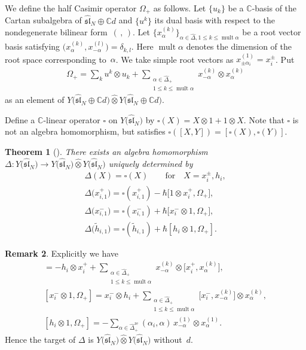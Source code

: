 \documentclass[10pt,a4paper]{amsart}
\newtheorem{thm}{Theorem}[section]
\theoremstyle{definition}
\newtheorem{rem}[thm]{Remark}
\numberwithin{equation}{section}
\DeclareMathOperator{\mult}{mult}
\newcommand{\bbC}{\mathbb{C}}
\newcommand{\affY}{Y\big(\affsl\big)}
\newcommand{\affsl}{\hat{\mathfrak{sl}}_N}
\begin{document}
We define the half Casimir operator $\Omega_+$ as follows. Let $\{u_k\}$ be a $\bbC$-basis of the Cartan subalgebra of $\affsl \oplus \bbC d$ and $\big\{u^k\big\}$ its dual basis with respect to the nondegenerate bilinear form~$(\, ,\, )$. Let $\big\{x_{\alpha}^{(k)}\big\}_{\alpha \in \hat{\Delta}, 1 \leq k \leq \mult \alpha}$ be a root vector basis satisfying $\big(x_{\alpha}^{(k)},x_{-\alpha}^{(l)}\big) = \delta_{k,l}$. Here $\mult \alpha$ denotes the dimension of the root space corresponding to~$\alpha$. We take simple root vectors as $x_{\pm \alpha_i}^{(1)} = x_i^{\pm}$. Put
\begin{gather*}
\Omega_+ = \sum_{k} u^k \otimes u_k + \sum_{\substack{\alpha \in \hat{\Delta}_+ \\ 1 \leq k \leq \mult \alpha}} x_{-\alpha}^{(k)} \otimes x_{\alpha}^{(k)}
\end{gather*}
as an element of $Y\big(\affsl \oplus \bbC d\big) \widehat{\otimes} Y\big(\affsl \oplus \bbC d\big)$.

Define a $\bbC$-linear operator $\square$ on $\affY$ by $\square(X) = X \otimes 1 + 1 \otimes X$. Note that $\square$ is not an algebra homomorphism, but satisfies $\square([X,Y]) = [\square(X), \square(Y)]$.
\begin{thm}[{\cite[Definition~4.6, Theorem~4.9, Proposition~5.18, Section~7]{MR3861718}}]\label{thm:definition_of_coproduct} There exists an algebra homomorphism $\Delta \colon \affY \to \affY \widehat{\otimes} \affY$ uniquely determined by
\begin{gather*}
\Delta(X) = \square(X) \qquad \text{for} \quad X=x_{i}^{\pm}, h_i,\\
\Delta\big(x_{i,1}^+\big) = \square(x_{i,1}^+) - \hbar \big[1 \otimes x_i^+, \Omega_+\big],\\
\Delta\big(x_{i,1}^-\big) = \square(x_{i,1}^-) + \hbar \big[x_i^- \otimes 1, \Omega_+\big],\\
\Delta\big(\tilde{h}_{i,1}\big)= \square(\tilde{h}_{i,1}) + \hbar [h_i \otimes 1, \Omega_+].
\end{gather*}
\end{thm}
\begin{rem}Explicitly we have
\begin{gather*}
[1 \otimes x_i^+, \Omega_+] = -h_i \otimes x_i^+ + \sum_{\substack{\alpha \in \hat{\Delta}_+\\ 1 \leq k \leq \mult \alpha}} x_{-\alpha}^{(k)} \otimes \big[x_i^+, x_{\alpha}^{(k)}\big],
\\
[x_i^- \otimes 1, \Omega_+] = x_i^- \otimes h_i + \sum_{\substack{\alpha \in \hat{\Delta}_+\\ 1 \leq k \leq \mult \alpha}} \big[x_i^-, x_{-\alpha}^{(k)}\big] \otimes x_{\alpha}^{(k)},
\\
[h_i \otimes 1, \Omega_+] = - \sum_{\alpha \in \hat{\Delta}_+^{\mathrm{re}}} (\alpha_i,\alpha)\, x_{-\alpha}^{(1)} \otimes x_{\alpha}^{(1)}.
\end{gather*}
Hence the target of $\Delta$ is $\affY \widehat{\otimes} \affY$ without~$d$.
\end{rem}
\end{document}

